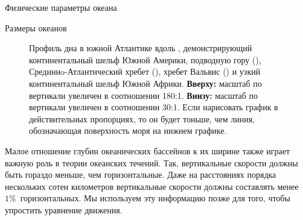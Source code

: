 \begin{chapter}{Физические параметры океана}
\begin{section}{Размеры океанов}
\begin{figure}[t!]
\caption{Профиль дна в южной Атлантике вдоль , демонстрирующий 
континентальный шельф Южной Америки, подводную гору (), 
Срединнo-Атлантический хребет (), 
хребет Вальвис () и узкий континентальный шельф Южной Африки. 
\textbf{Вверху:} масштаб по вертикали увеличен в соотношении 180:1. 
\textbf{Внизу:} масштаб по вертикали увеличен в соотношении 30:1. 
Если нарисовать график в действительных пропорциях, то он будет тоньше, 
чем линия, обозначающая поверхность моря на нижнем графике.}
\label{fig:bathy}
\end{figure}
%

Малое отношение глубин океанических бассейнов к их ширине также играет 
важную роль в теории океанских течений. Так, вертикальные скорости 
должны быть гораздо меньше, чем горизонтальные. Даже на расстояниях
порядка нескольких сотен километров вертикальные скорости должны составлять 
менее $1\%$~горизонтальных. Мы используем эту информацию позже для того, 
чтобы упростить уравнение движения.
%


\end{section}
\end{chapter}

